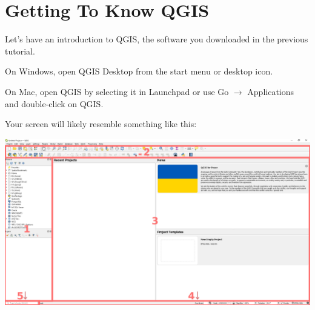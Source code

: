 \documentclass[oneside,a4paper,11pt,explicit]{book}
\begin{document}
\section{Getting To Know QGIS}

Let's have an introduction to QGIS, the software you downloaded in the previous tutorial. 

On Windows, open QGIS Desktop from the start menu or desktop icon. 

On Mac, open QGIS by selecting it in Launchpad or use Go $\rightarrow$ Applications and double-click on QGIS.

Your screen will likely resemble something like this:

\centerline{\includegraphics[width=\textwidth]{QGISscreen.png}}
\end{document}

